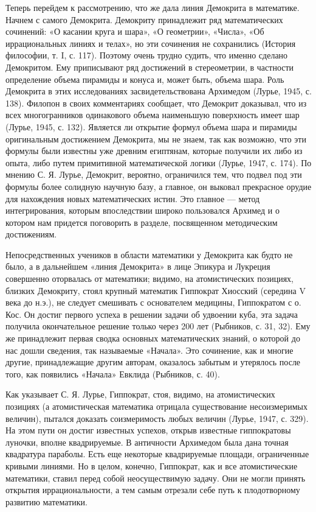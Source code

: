 Теперь перейдем к рассмотрению, что же дала линия Демокрита в
математике. Начнем с самого Демокрита. Демокриту принадлежит ряд
математических сочинений: «О касании круга и шара», «О геометрии»,
«Числа», «Об иррациональных линиях и телах», но эти сочинения не
сохранились (История философии, т. I, с. 117). Поэтому очень трудно
судить, что именно сделано Демокритом. Ему приписывают ряд достижений
в стереометрии, в частности определение объема пирамиды и конуса и,
может быть, объема шара. Роль Демокрита в этих исследованиях
засвидетельствована Архимедом (Лурье, 1945, с. 138). Филопон в своих
комментариях сообщает, что Демокрит доказывал, что из всех
многогранников одинакового объема наименьшую поверхность имеет шар
(Лурье, 1945, с. 132). Является ли открытие формул объема шара и
пирамиды оригинальным достижением Демокрита, мы не знаем, так как
возможно, что эти формулы были известны уже древним египтянам, которые
получили их либо из опыта, либо путем примитивной математической
логики (Лурье, 1947, с. 174). По мнению С. Я. Лурье, Демокрит,
вероятно, ограничился тем, что подвел под эти формулы более солидную
научную базу, а главное, он выковал прекрасное орудие для нахождения
новых математических истин. Это главное --- метод интегрирования,
которым впоследствии широко пользовался Архимед и о котором нам
придется поговорить в разделе, посвященном методическим достижениям.

Непосредственных учеников в области математики у Демокрита как будто
не было, а в дальнейшем «линия Демокрита» в лице Эпикура и Лукреция
совершенно оторвалась от математики; видимо, на атомистических
позициях, близких Демокриту, стоял крупный математик Гиппократ
Хиосский (середина V века до н.э.), не следует смешивать с
основателем медицины, Гиппократом с о. Кос. Он достиг первого успеха в
решении задачи об удвоении куба, эта задача получила окончательное
решение только через 200 лет (Рыбников, с. 31, 32). Ему же принадлежит
первая сводка основных математических знаний, о которой до нас дошли
сведения, так называемые «Начала». Это сочинение, как и многие другие,
принадлежащие другим авторам, оказалось забытым и утерялось после
того, как появились «Начала» Евклида (Рыбников, с. 40).

Как указывает С. Я. Лурье, Гиппократ, стоя, видимо, на атомистических
позициях (а атомистическая математика отрицала существование
несоизмеримых величин), пытался доказать соизмеримость любых величин
(Лурье, 1947, с. 329). На этом пути он достиг известных успехов,
открыв известные гиппократовы луночки, вполне квадрируемые. В
античности Архимедом была дана точная квадратура параболы. Есть еще
некоторые квадрируемые площади, ограниченные кривыми линиями. Но в
целом, конечно, Гиппократ, как и все атомистические математики, ставил
перед собой неосуществимую задачу. Они не могли принять открытия
иррациональности, а тем самым отрезали себе путь к плодотворному
развитию математики.

